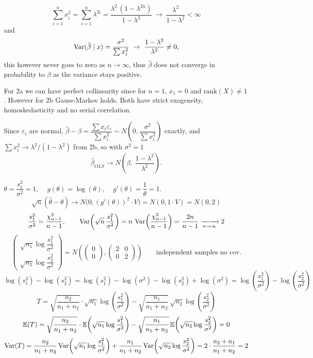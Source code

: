 \documentclass[11pt]{article}
\begin{document}
\[
\sum_{i=1}^n x_i^2=\sum_{i=1}^n\lambda^{2i}=\frac{\lambda^2\,(1-\lambda^{2n})}{1-\lambda^2}\ \to\ \frac{\lambda^2}{1-\lambda^2}<\infty
\]
and
\[
\operatorname{Var}(\hat\beta\mid x)=\frac{\sigma^2}{\sum x_i^2}\ \to\ \frac{1-\lambda^2}{\lambda^2}\neq0 ,
\]
this however never goes to zero as $n\to\infty$, thus $\hat\beta$ does not converge in probability to $\beta$ as the variance stays positive.

For 2a we can have perfect collinearity since for $n=1$, $x_1=0$ and $\mathrm{rank}(X)\neq1$. However for 2b Gauss-Markov holds. Both have strict exogeneity, homoskedasticity and no serial correlation.

Since $\varepsilon_i$ are normal, $\hat\beta-\beta=\dfrac{\sum x_i\varepsilon_i}{\sum x_i^2}\sim N\!\left(0,\dfrac{\sigma^2}{\sum x_i^2}\right)$ exactly, and $\sum x_i^2\to\lambda^2/(1-\lambda^2)$ from 2b, so with $\sigma^2=1$
\[
\hat\beta_{OLS}\to N\!\left(\beta,\ \frac{1-\lambda^2}{\lambda^2}\right).
\]


$\theta=\dfrac{s_1^2}{\sigma^2}=1$, $\quad g(\theta)=\log(\theta)$, $\quad g'(\theta)=\dfrac1\theta=1$.
\[
\sqrt n(\hat\theta-\theta)\to N\big(0,(g'(\theta))^2\cdot V\big)=N(0,1\cdot V)=N(0,2)
\]
\[
\frac{s_1^2}{\sigma^2}=\frac{\chi^2_{n-1}}{n-1},\qquad
\operatorname{Var}\!\left(\sqrt n\,\frac{s_1^2}{\sigma^2}\right)=n\,\operatorname{Var}\!\left(\frac{\chi^2_{n-1}}{n-1}\right)=\frac{2n}{n-1}\xrightarrow[n\to\infty]{}2
\]
\[
\begin{pmatrix}\sqrt{n_1}\log\dfrac{s_1^2}{\sigma^2}\\[2mm]\sqrt{n_2}\log\dfrac{s_2^2}{\sigma^2}\end{pmatrix}
=N\!\left(\begin{pmatrix}0\\0\end{pmatrix},\begin{pmatrix}2&0\\0&2\end{pmatrix}\right)
\qquad\text{independent samples no cov.}
\]
\[
\log(s_1^2)-\log(s_2^2)=\log(s_1^2)-\log(\sigma^2)-\log(s_2^2)+\log(\sigma^2)
=\log\!\left(\frac{s_1^2}{\sigma^2}\right)-\log\!\left(\frac{s_2^2}{\sigma^2}\right)
\]
\[
T=\sqrt{\frac{n_2}{n_1+n_2}}\cdot\sqrt{n_1}\log\!\left(\frac{s_1^2}{\sigma^2}\right)-\sqrt{\frac{n_1}{n_1+n_2}}\,\sqrt{n_2}\log\!\left(\frac{s_2^2}{\sigma^2}\right)
\]
\[
\mathbb{E}(T)=\sqrt{\frac{n_2}{n_1+n_2}}\cdot\mathbb{E}\!\left(\sqrt{n_1}\log\frac{s_1^2}{\sigma^2}\right)-\sqrt{\frac{n_1}{n_1+n_2}}\,\mathbb{E}\!\left(\sqrt{n_2}\log\frac{s_2^2}{\sigma^2}\right)=0
\]
\[
\operatorname{Var}(T)=\frac{n_2}{n_1+n_2}\operatorname{Var}\!\left(\sqrt{n_1}\log\frac{s_1^2}{\sigma^2}\right)+\frac{n_1}{n_1+n_2}\operatorname{Var}\!\left(\sqrt{n_2}\log\frac{s_2^2}{\sigma^2}\right)=2\cdot\frac{n_2+n_1}{n_1+n_2}=2
\]
\end{document}
